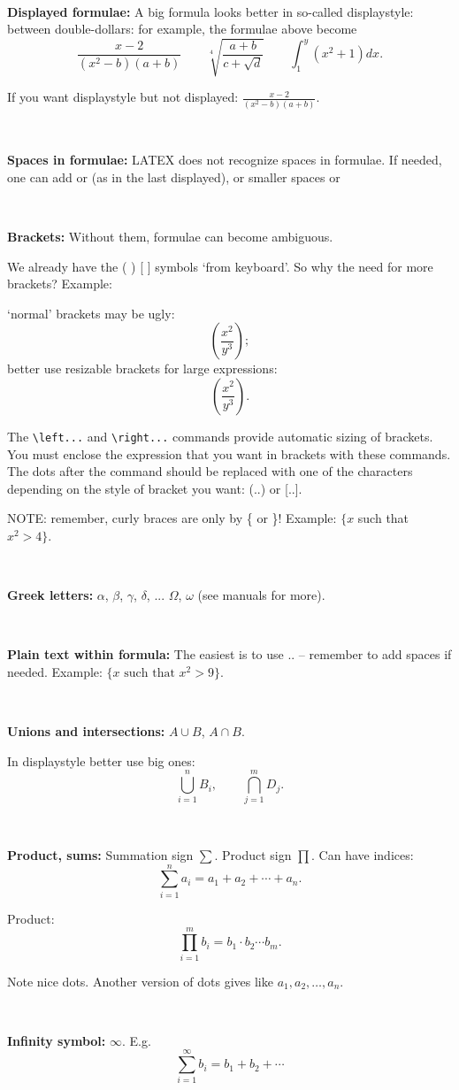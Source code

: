 \documentclass{article}
\begin{document}
\

\textbf{Displayed formulae:} A big formula looks better in so-called displaystyle: between double-dollars: for example, the formulae above become
$$
\frac{x-2}{(x^2-b)(a+b)}
\qquad                       %
\sqrt[4]{\frac{a+b}{c+\sqrt{d}}}\qquad \int_{1}^{y}(x^{2}+1)dx.
$$

If you want displaystyle but not displayed: $\displaystyle{\frac{x-2}{(x^2-b)(a+b)}}$.

\

\textbf{Spaces in formulae:} LATEX does not recognize spaces in formulae. If needed, one can add %
or %
(as in the last displayed), 
or smaller spaces %
or %

\

\textbf{Brackets:} Without them, formulae can become ambiguous.

We already have the ( ) [ ] symbols `from keyboard'. So why the need for more brackets?
Example:

`normal'                     brackets may be ugly:
$$(\frac{x^2}{y^3});$$	
better use  resizable
                    brackets for large expressions:
$$\left(\frac{x^2}{y^3}\right).$$	

The \verb#\left...# and \verb#\right...# commands provide  automatic sizing of brackets. You must enclose the expression that you want in brackets with these commands. The dots after the command should be replaced with one of the characters depending on the style of bracket you want: (..) or [..].


NOTE: remember, curly braces are only by \{ or \}! Example: $\{x$ such that $x^2>4\}$.


\

\textbf{Greek letters:} $\alpha$,  $\beta$, $\gamma$, $\delta$, ... $\Omega$, $\omega$ (see manuals for more).

\


\textbf{Plain text within formula:} The easiest is to use \mbox{..} -- remember to add spaces if needed. Example: $\{x\mbox{ such that } x^2>9\}$.

\

\textbf{Unions and intersections:} $A\cup B$, $A\cap B$.

In displaystyle better use big ones:
$$\bigcup_{i=1}^{n} B_i,\qquad  \bigcap _{j=1}^{m}D_j.$$

\

\textbf{Product, sums:} Summation sign $\sum $. Product sign $\prod$. Can have indices:
$$
\sum_{i=1}^{n}a_i=a_1+a_2+\cdots +a_n.
$$

Product:
$$
\prod_{i=1}^{m}b_i=b_1\cdot b_2\cdots b_m.
$$

Note  nice dots.  %
Another version of dots %
gives like
$a_1,a_2,\ldots ,a_n$.

\

\textbf{Infinity symbol:} $\infty$. E.g.
$$
\sum_{i=1}^{\infty }b_i=b_1+ b_2+\cdots
$$
\end{document}
